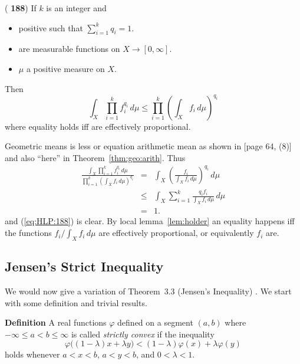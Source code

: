\begin{llem} \textnormal{(\cite{Hardy:1952:I} \textbf{188})}
\label{llem:hlp:188}
If $k$ is an integer and
\begin{itemize}
 \item {} positive such that \(\sum_{i=1}^k q_i = 1\).
 \item {} are measurable functions on \(X\to [0,\infty]\).
 \item \(\mu\) a positive measure on $X$.
\end{itemize}
Then
\begin{equation} \label{eq:HLP:188}
\int_X \prod_{i=1}^k f_i^{q_i}\,d\mu \leq
\prod_{i=1}^k \left(\int_X f_i\,d\mu\right)^{q_i}
\end{equation}
where equality holds iff  are effectively proportional.
\end{llem}

\begin{thmproof}
Geometric means is less or equation arithmetic mean as shown
in \cite{RudinRCA80} [page 64, (8)]
and also ``here'' in Theorem~\ref{thm:geo:arith}.
Thus
\begin{eqnarray*}
\frac{\int_X \prod_{i=1}^k f_i^{q_i}\,d\mu}{
 \prod_{i=1}^k \left(\int_X f_i\,d\mu\right)^{q_i}}
 &=& \int_X \left(\frac{f_i}{\int_X f_i\,d\mu}\right)^{q_i}\,d\mu \\
 &\leq& \int_X \sum_{i=1}^k \frac{q_i f_i}{\int_X f_i\,d\mu}\,d\mu \\
 &=& 1.
\end{eqnarray*}
and (\ref{eq:HLP:188}) is clear. By local lemma~\ref{lem:holder}
an equality happens iff
the functions \(f_i/{\int_X f_i\,d\mu}\) are effectively proportional,
or equivalently \(f_i\) are.
\end{thmproof}


\subsection{Jensen's Strict Inequality}

We would now give a variation of Theorem~3.3 (Jensen's Inequality)
\cite{RudinRCA80}. We start with some definition and trivial results.

\textbf{Definition} A real functions \(\varphi\) defined on
a segment \((a,b)\) where \(-\infty\leq a < b \leq \infty\)
is called \emph{strictly convex} if the inequality
\begin{equation} \label{eq:convex:def}
 \varphi\bigl((1-\lambda)x + \lambda y\bigr) <
 (1-\lambda)\varphi(x) + \lambda\varphi(y)
\end{equation}
holds whenever \(a<x<b\), \(a<y<b\),  and \(0<\lambda<1\).

